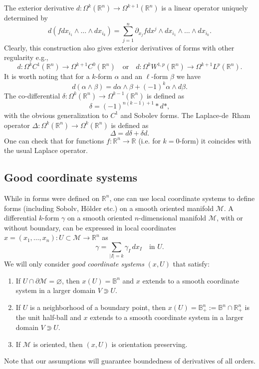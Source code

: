 \documentclass[intlimits,12pt,reqno]{amsart}
\newcommand{\cM}{\mathcal M}
\newcommand{\bbbb}{\mathbb B}
\newcommand{\R}{\mathbb R}
\numberwithin{equation}{section}
\theoremstyle{definition}
\newcommand{\brac}[1]{\left ( #1 \right )}
\newcommand{\lap}{\Delta}
\begin{document}
The exterior derivative $d:\Omega^k(\R^n)\to\Omega^{k+1}(\R^n)$ is a linear operator uniquely determined by
$$
d\brac{f dx_{i_1}\wedge \ldots \wedge dx_{i_k}} = 
\sum_{j=1}^n \partial_{x_j} f dx^j \wedge dx_{i_1}\wedge \ldots \wedge dx_{i_k}.
$$
Clearly, this construction also gives exterior derivatives of forms with other regularity e.g.,
$$
d:\Omega^k C^1(\R^n)\to \Omega^{k+1} C^0(\R^n) 
\quad
\text{or}
\quad
d:\Omega^k W^{1,p}(\R^n)\to \Omega^{k+1} L^p(\R^n).
$$
It is worth noting that for a $k$-form $\alpha$ and an $\ell$-form $\beta$ we have
\begin{equation}\label{eq:dproductrule}
 d (\alpha \wedge \beta) = d\alpha \wedge \beta + (-1)^k \alpha \wedge d \beta.
\end{equation}
The co-differential $\delta: \Omega^k(\R^n) \to \Omega^{k-1}(\R^n)$ is defined as 
$$
\delta = (-1)^{n(k-1)+1}\ast d \ast,
$$
with the obvious generalization to $C^1$ and Sobolev forms. The Laplace-de~Rham operator $\lap: \Omega^k(\R^n) \to \Omega^k(\R^n)$ is defined as 
\[
 \lap = d \delta + \delta d.
\]
One can check that for functions $f: \R^n \to \R$ (i.e. for $k=0$-form) it coincides with the usual Laplace operator.



\subsection{Good coordinate systems}
\label{GCS}
While in  forms were defined on $\R^n$, one can use local coordinate systems to define forms (including Sobolv, H\"older etc.) on a smooth oriented manifold $\cM$.
A differential $k$-form $\gamma$ on a smooth oriented $n$-dimensional manifold $\cM$, with or without boundary, can be expressed in local coordinates
$x=(x_1,\ldots,x_n):U\subset\cM\to\R^n$ as
$$
\gamma =\sum_{|I|=k}\gamma_I\, dx_I
\quad
\text{in $U$.}
$$
We will only consider {\em good coordinate systems} $(x,U)$ that satisfy:
\begin{enumerate}
\item If $U\cap\partial\cM=\varnothing$, then $x(U)=\bbbb^n$ and  $x$ extends to a smooth coordinate system in a larger domain $V\Supset U$. 
\item If $U$ is a neighborhood of a boundary point, then $x(U)=\bbbb^n_+:=\bbbb^n\cap\R^n_+$ is the unit half-ball and $x$ extends to a smooth coordinate system in a larger domain $V\Supset U$. 
\item If $\cM$ is oriented, then $(x,U)$ is orientation preserving.
\end{enumerate}
Note that our assumptions will guarantee boundedness of derivatives of all orders.
\end{document}
